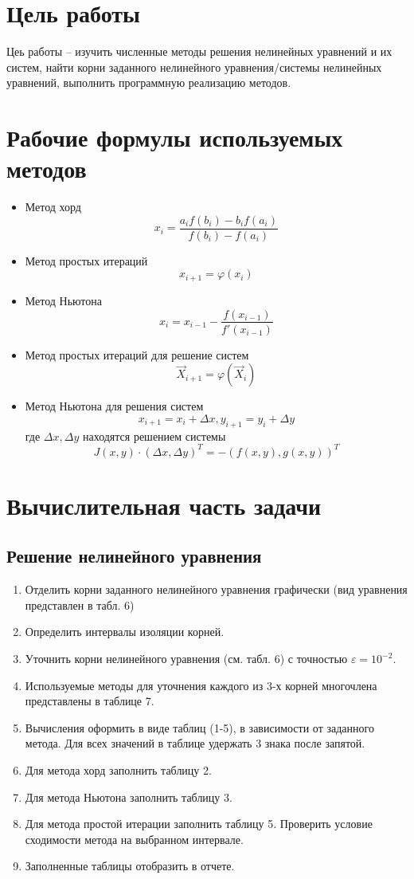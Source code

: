 \section{Цель работы}
Цеь работы -- изучить численные методы решения нелинейных уравнений и их
систем, найти корни заданного нелинейного уравнения/системы нелинейных уравнений,
выполнить программную реализацию методов.

\section{Рабочие формулы используемых методов}
\begin{itemize}
	\item Метод хорд \[ x_i = \frac{a_i f(b_i) - b_i f(a_i)}{f(b_i) - f(a_i)} \]
	\item Метод простых итераций \[ x_{i+1} = \varphi(x_i) \]
	\item Метод Ньютона \[ x_i = x_{i-1} - \frac{f(x_{i-1})}{f'(x_{i-1})} \]
	\item Метод простых итераций для решение систем \[ \vec X_{i+1} = \varphi (\vec X_{i}) \]
	\item Метод Ньютона для решения систем \[ x_{i+1} = x_i + \Delta x, y_{i+1} = y_i + \Delta y \]
	      где \( \Delta x, \Delta y \) находятся решением системы
	      \[ J(x,y) \cdot (\Delta x, \Delta y)^T = - (f(x,y), g(x,y))^T \]
\end{itemize}

\section{Вычислительная часть задачи}
\subsection{Решение нелинейного уравнения}
\begin{enumerate}
	\item Отделить корни заданного нелинейного уравнения графически (вид уравнения представлен в табл. 6)
	\item Определить интервалы изоляции корней.
	\item Уточнить корни нелинейного уравнения (см. табл. 6) с точностью $\varepsilon = 10^{-2}$.
	\item Используемые методы для уточнения каждого из 3-х корней многочлена представлены в таблице 7.
	\item Вычисления оформить в виде таблиц (1-5), в зависимости от заданного метода. Для всех значений в таблице удержать 3 знака после запятой.
	\item Для метода хорд заполнить таблицу 2.
	\item Для метода Ньютона заполнить таблицу 3.
	\item Для метода простой итерации заполнить таблицу 5. Проверить условие сходимости метода на выбранном интервале.
	\item Заполненные таблицы отобразить в отчете.
\end{enumerate}

